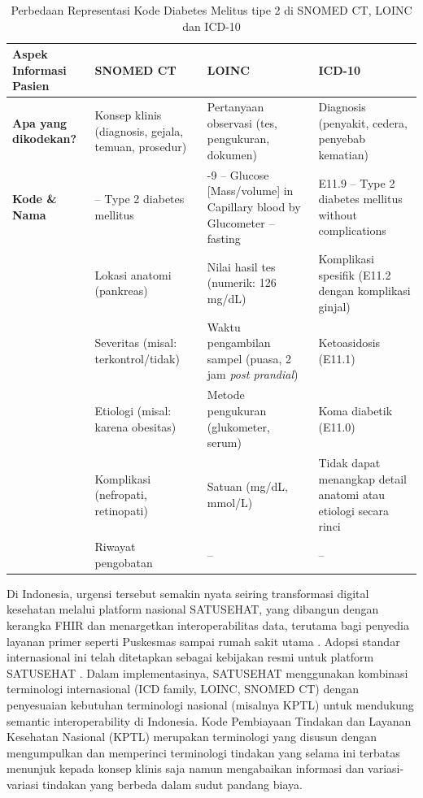 \begin{table}[H]
\centering
\fontsize{10pt}{11pt}\selectfont
\setlength{\tabcolsep}{4pt}
\caption{Perbedaan Representasi Kode Diabetes Melitus tipe 2 di SNOMED CT, LOINC dan ICD-10}
\label{tab:perbedaan-snomed-loinc-icd}
\renewcommand{\arraystretch}{1.1}
\begin{tabularx}{\textwidth}{>{\centering\arraybackslash}p{2.8cm} >{\raggedright\arraybackslash}X >{\raggedright\arraybackslash}X >{\raggedright\arraybackslash}X}
\toprule
\textbf{Aspek Informasi Pasien} & \centering\textbf{SNOMED CT}\arraybackslash & \centering\textbf{LOINC}\arraybackslash & \centering\textbf{ICD-10}\arraybackslash \\
\midrule
\textbf{Apa yang dikodekan?} & Konsep klinis (diagnosis, gejala, temuan, prosedur) & Pertanyaan observasi (tes, pengukuran, dokumen) & Diagnosis (penyakit, cedera, penyebab kematian) \\
\midrule
\textbf{Kode \& Nama} & 44054006 -- Type 2 diabetes mellitus & 14771-9 -- Glucose [Mass/volume] in Capillary blood by Glucometer -- fasting & E11.9 -- Type 2 diabetes mellitus without complications \\
\midrule
\multirow{5}{=}{\centering\textbf{Informasi tambahan yang bisa ditangkap}} & Lokasi anatomi (pankreas) & Nilai hasil tes (numerik: 126 mg/dL) & Komplikasi spesifik (E11.2 dengan komplikasi ginjal) \\
\cmidrule(l){2-4}
 & Severitas (misal: terkontrol/tidak) & Waktu pengambilan sampel (puasa, 2 jam \textit{post prandial}) & Ketoasidosis (E11.1) \\
\cmidrule(l){2-4}
 & Etiologi (misal: karena obesitas) & Metode pengukuran (glukometer, serum) & Koma diabetik (E11.0) \\
\cmidrule(l){2-4}
 & Komplikasi (nefropati, retinopati) & Satuan (mg/dL, mmol/L) & Tidak dapat menangkap detail anatomi atau etiologi secara rinci \\
\cmidrule(l){2-4}
 & Riwayat pengobatan & -- & -- \\
\bottomrule
\end{tabularx}
\renewcommand{\arraystretch}{1}
\setlength{\tabcolsep}{6pt}
\end{table}

Di Indonesia, urgensi tersebut semakin nyata seiring transformasi digital kesehatan melalui platform nasional SATUSEHAT, yang dibangun dengan kerangka FHIR dan menargetkan interoperabilitas data, terutama bagi penyedia layanan primer seperti Puskesmas sampai rumah sakit utama \citep{heryawan_fast_2025}. Adopsi standar internasional ini telah ditetapkan sebagai kebijakan resmi untuk platform SATUSEHAT \citep{ayuningtyas_bringing_2025}. Dalam implementasinya, SATUSEHAT menggunakan kombinasi terminologi internasional (ICD family, LOINC, SNOMED CT) dengan penyesuaian kebutuhan terminologi nasional (misalnya KPTL) untuk mendukung semantic interoperability di Indonesia. Kode Pembiayaan Tindakan dan Layanan Kesehatan Nasional (KPTL) merupakan terminologi yang disusun dengan mengumpulkan dan memperinci terminologi tindakan yang selama ini terbatas menunjuk kepada konsep klinis saja namun mengabaikan informasi dan variasi-variasi tindakan yang berbeda dalam sudut pandang biaya.

